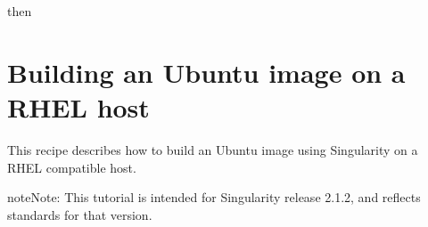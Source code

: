 \documentclass[letterpaper,10pt,english]{sphinxmanual}
\begin{document}
%
\begin{sphinxVerbatim}[commandchars=\\\{\}]

 
\end{sphinxVerbatim}

then

%
\begin{sphinxVerbatim}[commandchars=\\\{\}]
             
\end{sphinxVerbatim}


\section{Building an Ubuntu image on a RHEL host}
\label{\detokenize{appendix:building-an-ubuntu-image-on-a-rhel-host}}\label{\detokenize{appendix:sec-building-ubuntu-rhel-host}}
This recipe describes how to build an Ubuntu image using Singularity on a RHEL compatible host.

\begin{sphinxadmonition}{note}{Note:}
This tutorial is intended for Singularity release 2.1.2,
and reflects standards for that version.
\end{sphinxadmonition}
\end{document}
